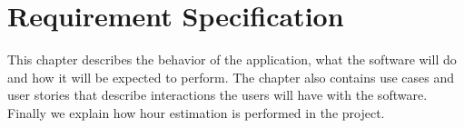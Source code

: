 \chapter{Requirement Specification}

	This chapter describes the behavior of the application, what the software will do 
	and how it will be expected to perform. The chapter also contains use cases and user 
	stories that describe interactions the users will have with the software. Finally we 
	explain how hour estimation is performed in the project. 
